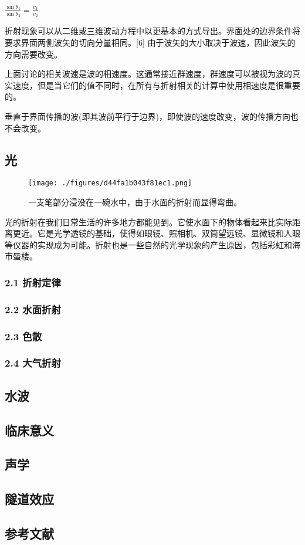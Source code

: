 $\frac{\sin \theta_1}{\sin \theta_2} = \frac{v_1}{v_2}  $

折射现象可以从二维或三维波动方程中以更基本的方式导出。界面处的边界条件将要求界面两侧波矢的切向分量相同。[6] 由于波矢的大小取决于波速，因此波矢的方向需要改变。

上面讨论的相关波速是波的相速度。这通常接近群速度，群速度可以被视为波的真实速度，但是当它们的值不同时，在所有与折射相关的计算中使用相速度是很重要的。

垂直于界面传播的波(即其波前平行于边界)，即使波的速度改变，波的传播方向也不会改变。

\subsection{光}

\begin{figure}[ht]
\centering
\texttt{[image: ./figures/d44fa1b043f81ec1.png]}
\caption{一支笔部分浸没在一碗水中，由于水面的折射而显得弯曲。} \label{fig_ZS_3}
\end{figure}

光的折射在我们日常生活的许多地方都能见到。它使水面下的物体看起来比实际距离更近。它是光学透镜的基础，使得如眼镜、照相机、双筒望远镜、显微镜和人眼等仪器的实现成为可能。折射也是一些自然的光学现象的产生原因，包括彩虹和海市蜃楼。

\subsubsection{2.1 折射定律}


\subsubsection{2.2 水面折射}

\subsubsection{2.3 色散}

\subsubsection{2.4 大气折射}

\subsection{水波}

\subsection{临床意义}

\subsection{声学}

\subsection{隧道效应}

\subsection{参考文献}